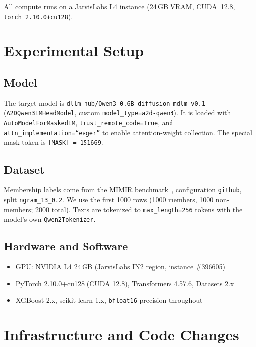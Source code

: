 \documentclass[11pt,a4paper]{article}
\begin{document}
All compute runs on a JarvisLabs L4 instance (24\,GB VRAM, CUDA~12.8,
\texttt{torch 2.10.0+cu128}).

\section{Experimental Setup}

\subsection{Model}

The target model is \texttt{dllm-hub/Qwen3-0.6B-diffusion-mdlm-v0.1}
(\texttt{A2DQwen3LMHeadModel}, custom \texttt{model\_type=a2d-qwen3}).
It is loaded with \texttt{AutoModelForMaskedLM}, \texttt{trust\_remote\_code=True},
and \texttt{attn\_implementation=``eager''} to enable attention-weight collection.
The special mask token is \texttt{[MASK]~=~151669}.

\subsection{Dataset}

Membership labels come from the MIMIR benchmark~\cite{mimir},
configuration \texttt{github}, split \texttt{ngram\_13\_0.2}.
We use the first 1000 rows (1000 members, 1000 non-members; 2000 total).
Texts are tokenized to \texttt{max\_length=256} tokens with the model's own
\texttt{Qwen2Tokenizer}.

\subsection{Hardware and Software}

\begin{itemize}
  \item GPU: NVIDIA L4 24\,GB (JarvisLabs IN2 region, instance \#396605)
  \item PyTorch 2.10.0+cu128 (CUDA 12.8), Transformers 4.57.6, Datasets 2.x
  \item XGBoost 2.x, scikit-learn 1.x, \texttt{bfloat16} precision throughout
\end{itemize}

\section{Infrastructure and Code Changes}
\end{document}
